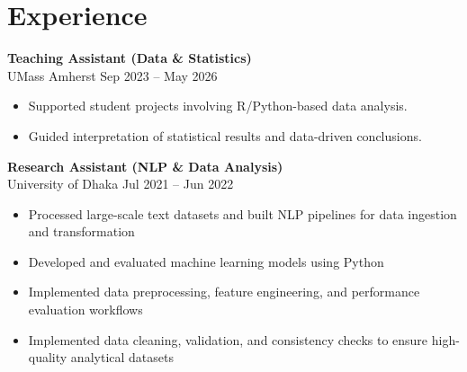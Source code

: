 \documentclass[10pt, letterpaper]{article}
\begin{document}



    \section*{Experience}
    \textbf{Teaching Assistant (Data \& Statistics)} \\
UMass Amherst \hfill Sep 2023 -- May 2026
\begin{itemize}
    \item Supported student projects involving R/Python-based data analysis.
    \item Guided interpretation of statistical results and data-driven conclusions.
\end{itemize}

   \textbf{Research Assistant (NLP \& Data Analysis)} \\
   University of Dhaka \hfill Jul 2021 -- Jun 2022
   \begin{itemize}
    \item Processed large-scale text datasets and built NLP pipelines for data ingestion and transformation
    \item Developed and evaluated machine learning models using Python
    \item Implemented data preprocessing, feature engineering, and performance evaluation workflows
    \item Implemented data cleaning, validation, and consistency checks to ensure high-quality analytical datasets
\end{itemize}
\end{document}
